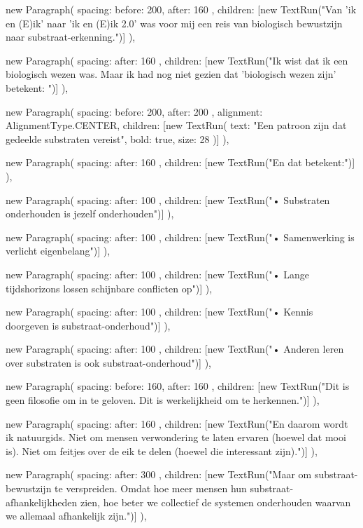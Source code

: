 {{      new Paragraph({
        spacing: { before: 200, after: 160 },
        children: [new TextRun("Van 'ik en (E)ik' naar 'ik en (E)ik 2.0' was voor mij een reis van biologisch bewustzijn naar substraat-erkenning.")]
      }),

      new Paragraph({
        spacing: { after: 160 },
        children: [new TextRun("Ik wist dat ik een biologisch wezen was. Maar ik had nog niet gezien dat 'biologisch wezen zijn' betekent: ")]
      }),

      new Paragraph({
        spacing: { before: 200, after: 200 },
        alignment: AlignmentType.CENTER,
        children: [new TextRun({ text: "Een patroon zijn dat gedeelde substraten vereist", bold: true, size: 28 })]
      }),

      new Paragraph({
        spacing: { after: 160 },
        children: [new TextRun("En dat betekent:")]
      }),

      new Paragraph({
        spacing: { after: 100 },
        children: [new TextRun("• Substraten onderhouden is jezelf onderhouden")]
      }),

      new Paragraph({
        spacing: { after: 100 },
        children: [new TextRun("• Samenwerking is verlicht eigenbelang")]
      }),

      new Paragraph({
        spacing: { after: 100 },
        children: [new TextRun("• Lange tijdshorizons lossen schijnbare conflicten op")]
      }),

      new Paragraph({
        spacing: { after: 100 },
        children: [new TextRun("• Kennis doorgeven is substraat-onderhoud")]
      }),

      new Paragraph({
        spacing: { after: 100 },
        children: [new TextRun("• Anderen leren over substraten is ook substraat-onderhoud")]
      }),

      new Paragraph({
        spacing: { before: 160, after: 160 },
        children: [new TextRun("Dit is geen filosofie om in te geloven. Dit is werkelijkheid om te herkennen.")]
      }),

      new Paragraph({
        spacing: { after: 160 },
        children: [new TextRun("En daarom wordt ik natuurgids. Niet om mensen verwondering te laten ervaren (hoewel dat mooi is). Niet om feitjes over de eik te delen (hoewel die interessant zijn).")]
      }),

      new Paragraph({
        spacing: { after: 300 },
        children: [new TextRun("Maar om substraat-bewustzijn te verspreiden. Omdat hoe meer mensen hun substraat-afhankelijkheden zien, hoe beter we collectief de systemen onderhouden waarvan we allemaal afhankelijk zijn.")]
      }),

}}
